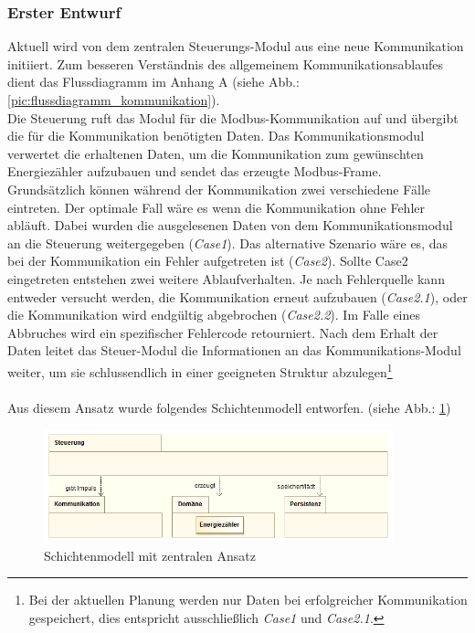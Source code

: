 \documentclass[Bachelorarbeit.tex]{subfiles}
\begin{document}
\subsubsection*{Erster Entwurf}
Aktuell wird von dem zentralen Steuerungs-Modul aus eine neue Kommunikation initiiert. Zum besseren Verständnis des allgemeinem Kommunikationsablaufes dient das Flussdiagramm im Anhang A (siehe Abb.: \ref{pic:flussdiagramm_kommunikation}). \\
Die Steuerung ruft das Modul für die Modbus-Kommunikation auf und übergibt die für die 
Kommunikation benötigten Daten.  Das Kommunikationsmodul 
verwertet die erhaltenen Daten, um die Kommunikation zum gewünschten 
Energiezähler aufzubauen und sendet das erzeugte Modbus-Frame. \\
Grundsätzlich können während der Kommunikation zwei verschiedene Fälle eintreten. 
Der optimale Fall wäre es wenn die Kommunikation ohne Fehler abläuft. 
Dabei wurden die ausgelesenen Daten von dem Kommunikationsmodul an die Steuerung weitergegeben (\textit{Case1}). 
Das alternative Szenario wäre es, das bei der Kommunikation ein Fehler aufgetreten ist (\textit{Case2}). Sollte Case2 eingetreten entstehen zwei weitere Ablaufverhalten. 
Je nach Fehlerquelle kann entweder versucht werden, die Kommunikation erneut aufzubauen (\textit{Case2.1}), oder die Kommunikation wird endgültig abgebrochen (\textit{Case2.2}).
Im Falle eines Abbruches wird ein spezifischer Fehlercode retourniert. 
Nach dem Erhalt der Daten leitet das Steuer-Modul die Informationen an das Kommunikations-Modul weiter, um sie schlussendlich in einer geeigneten Struktur abzulegen\footnote{Bei der aktuellen Planung werden nur Daten bei erfolgreicher Kommunikation gespeichert, dies entspricht ausschließlich \textit{Case1} und \textit{Case2.1}.}\\\\
Aus diesem Ansatz wurde folgendes Schichtenmodell entworfen. (siehe Abb.: \ref{pic:schicht_zentral})\\
\begin{figure}
\includegraphics[width=0.9\textwidth]{./img/Schichtenarchitektur_zentralisiert.png}
\caption{Schichtenmodell mit zentralen Ansatz}
\label{pic:schicht_zentral}
\end{figure}
\end{document}
